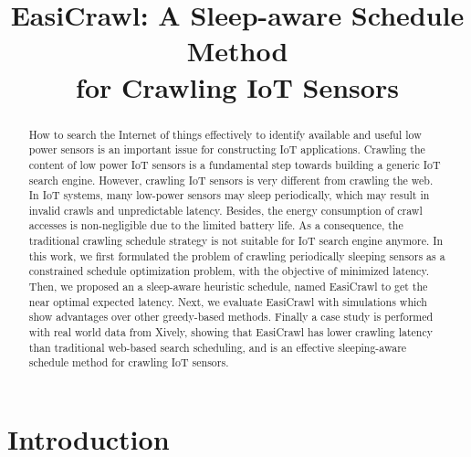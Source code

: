 \documentclass[conference]{IEEEtran}
\begin{document}
\title{EasiCrawl: A Sleep-aware Schedule Method \\for Crawling IoT Sensors}

\author{
}

\maketitle


\begin{abstract}
	
How to search the Internet of things effectively to identify available and useful low power sensors is an important issue for constructing IoT applications. 
Crawling the content of low power IoT sensors is a fundamental step towards building a generic IoT search engine.
However, crawling IoT sensors is very different from crawling the web. 
In IoT systems, many low-power sensors may sleep periodically, which may result in invalid crawls and unpredictable latency. 
Besides, the energy consumption of crawl accesses is non-negligible due to the limited battery life.
As a consequence, the traditional crawling schedule strategy is not suitable for IoT search engine anymore.
In this work, we first formulated the problem of crawling periodically sleeping sensors as a constrained schedule optimization problem, with the objective of minimized latency. 
Then, we proposed an a sleep-aware heuristic schedule, named EasiCrawl to get the near optimal expected latency. 
Next, we evaluate EasiCrawl with simulations which show advantages over other greedy-based methods.
Finally a case study is performed with real world data from Xively, showing that EasiCrawl has lower crawling latency than traditional web-based search scheduling, and is an effective sleeping-aware schedule method for crawling IoT sensors.

\end{abstract}

\IEEEpeerreviewmaketitle

\section{Introduction} \label{introduction}
\end{document}
